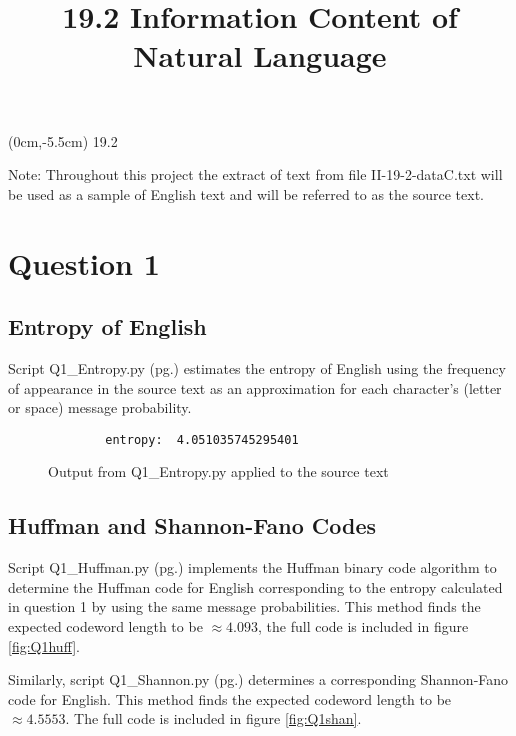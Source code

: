 \documentclass[a4paper]{article}
\title{\vspace*{2cm}19.2 Information Content of Natural Language\vspace*{-1.5cm}}
\date{}
\begin{document}
\maketitle

\begin{textblock*}{100mm}(0cm,-5.5cm)
\Huge 19.2
\end{textblock*}

Note: Throughout this project the extract of text from file II-19-2-dataC.txt will be used as a sample of English text and will be referred to as the source text.

\section*{Question 1}

\subsection*{Entropy of English}
Script Q1\_Entropy.py (pg.\pageref{PQ1_Entropy}) estimates the entropy of English using the frequency of appearance in the source text as an approximation for each character's (letter or space) message probability.
\begin{figure}[H]
    \centering
    \begin{verbatim}
        entropy:  4.051035745295401
    \end{verbatim}
    \caption{Output from Q1\_Entropy.py applied to the source text}
    \label{fig:Q1_Entropy}
\end{figure}

\subsection*{Huffman and Shannon-Fano Codes}

Script Q1\_Huffman.py (pg.\pageref{PQ1_Huffman}) implements the Huffman binary code algorithm to determine the Huffman code for English corresponding to the entropy calculated in question 1 by using the same message probabilities. This method finds the expected codeword length to be $\approx 4.093$, the full code is included in figure \ref{fig:Q1huff}.

\bigskip
Similarly, script Q1\_Shannon.py (pg.\pageref{PQ1_Shannon}) determines a corresponding Shannon-Fano code for English. This method finds the expected codeword length to be $\approx 4.5553$. The full code is included in figure \ref{fig:Q1shan}.
\end{document}
